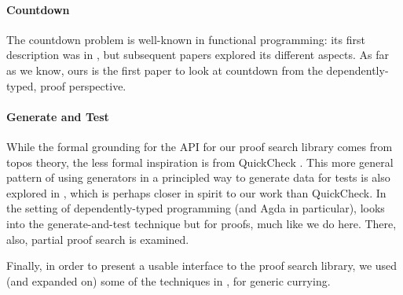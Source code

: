\paragraph{Countdown}
The countdown problem is well-known in functional programming: its first
description was in \citet{huttonCountdownProblem2002}, but subsequent papers
\cite{birdCountdownCaseStudy2005, birdFunctionalPearlTrouble2003}
explored its different aspects.
As far as we know, ours is the first paper to look at countdown from the
dependently-typed, proof perspective.
\paragraph{Generate and Test}
While the formal grounding for the API for our proof search library comes from
topos theory, the less formal inspiration is from QuickCheck
\cite{claessenQuickCheckLightweightTool2011}.
This more general pattern of using generators in a principled way to generate
data for tests is also explored in \citet{runcimanSmallCheckLazySmallCheck2008},
which is perhaps closer in spirit to our work than QuickCheck.
In the setting of dependently-typed programming (and Agda in particular),
\citet{oconnorApplicationsApplicativeProof2016} looks into the generate-and-test
technique but for proofs, much like we do here.
There, also, partial proof search is examined.

Finally, in order to present a usable interface to the proof search library, we
used (and expanded on) some of the techniques in
\citet{allaisGenericLevelPolymorphic2019}, for generic currying.

